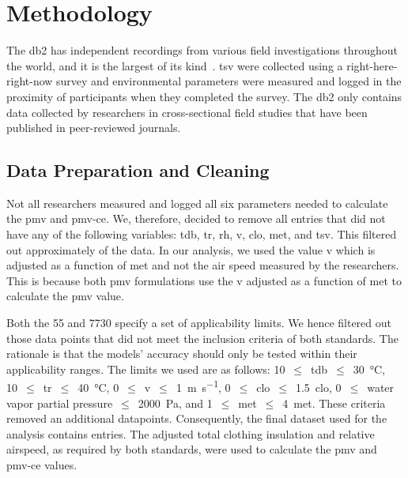 \section{Methodology}\label{sec:methodology}
The \ac{db2} has  independent recordings from various field investigations throughout the world, and it is the largest of its kind~\cite{FoldvaryLicina2018, db2dryad}.
\Ac{tsv} were collected using a right-here-right-now survey and environmental parameters were measured and logged in the proximity of participants when they completed the survey.
The \ac{db2} only contains data collected by researchers in cross-sectional field studies that have been published in peer-reviewed journals.

\subsection{Data Preparation and Cleaning}\label{subsec:data-processing-and-cleaning}
Not all researchers measured and logged all six parameters needed to calculate the \ac{pmv} and \ac{pmv-ce}.
We, therefore, decided to remove all entries that did not have any of the following variables: \ac{tdb}, \ac{tr}, \ac{rh}, \ac{v}, \ac{clo}, \ac{met}, and \ac{tsv}.
This filtered out approximately  of the data.
In our analysis, we used the value \ac{v} which is adjusted as a function of \ac{met} and not the air speed measured by the researchers.
This is because both \ac{pmv} formulations use the \ac{v} adjusted as a function of \ac{met} to calculate the \ac{pmv} value.

Both the \gls{55} and \gls{7730} specify a set of applicability limits.
We hence filtered out those data points that did not meet the inclusion criteria of both standards.
The rationale is that the models' accuracy should only be tested within their applicability ranges.
The limits we used are as follows:
\num{10}~$\leq$~\ac{tdb}~$\leq$~\qty{30}{\celsius},
\num{10}~$\leq$~\ac{tr}~$\leq$~\qty{40}{\celsius},
\num{0}~$\leq$~\ac{v}~$\leq$~\qty{1}{\m\per\s},
\num{0}~$\leq$~\ac{clo}~$\leq$~\qty{1.5}{clo},
\num{0}~$\leq$~water vapor partial pressure~$\leq$~\qty{2000}{\pascal},
and \num{1}~$\leq$~\ac{met}~$\leq$~\qty{4}{met}.
These criteria removed an additional  datapoints.
Consequently, the final dataset used for the analysis contains  entries.
The adjusted total clothing insulation and relative airspeed, as required by both standards, were used to calculate the \ac{pmv} and \ac{pmv-ce} values.

